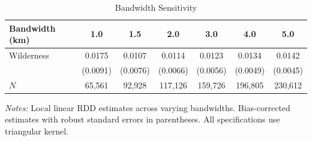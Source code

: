 \begin{table}[t]
\centering
\caption{Bandwidth Sensitivity}
\label{tab:bandwidth}
\begin{tabular}{lcccccc}
\hline\hline
Bandwidth (km) & 1.0 & 1.5 & 2.0 & 3.0 & 4.0 & 5.0 \\
\hline
Wilderness & 0.0175 & 0.0107 & 0.0114 & 0.0123 & 0.0134 & 0.0142 \\
 & (0.0091) & (0.0076) & (0.0066) & (0.0056) & (0.0049) & (0.0045) \\
\hline
$N$ &  65,561 &  92,928 & 117,126 & 159,726 & 196,805 & 230,612 \\
\hline\hline
\end{tabular}
\begin{tablenotes}[flushleft]
\small
\item \textit{Notes:} Local linear RDD estimates across varying bandwidths. Bias-corrected estimates with robust standard errors in parentheses. All specifications use triangular kernel.
\end{tablenotes}
\end{table}
